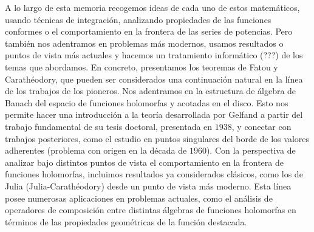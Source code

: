 A lo largo de esta memoria recogemos ideas de cada uno de estos matemáticos, usando técnicas de integración, analizando propiedades de las funciones conformes o el comportamiento en la frontera de las series de potencias. Pero también nos adentramos en problemas más modernos, usamos resultados o puntos de vista más actuales y hacemos un tratamiento informático (???) de los temas que abordamos. En concreto, presentamos los teoremas de Fatou y Carathéodory, que pueden ser considerados una continuación natural en la línea de los trabajos de los pioneros. Nos adentramos en la estructura de álgebra de Banach del espacio de funciones holomorfas y acotadas en el disco. Esto nos permite hacer una introducción a la teoría desarrollada por Gelfand a partir del trabajo fundamental de su tesis doctoral, presentada en $1938$, y conectar con trabajos posteriores, como el estudio en puntos singulares del borde de los valores adherentes (problema con origen en la década de $1960$). Con la perspectiva de analizar bajo distintos puntos de vista el comportamiento en la frontera de funciones holomorfas, incluimos resultados ya considerados clásicos, como los de Julia (Julia-Carathéodory) desde un punto de vista más moderno. Esta línea posee numerosas aplicaciones en problemas actuales, como el análisis de operadores de composición entre distintas álgebras de funciones holomorfas en términos de las propiedades geométricas de la función destacada. \\
